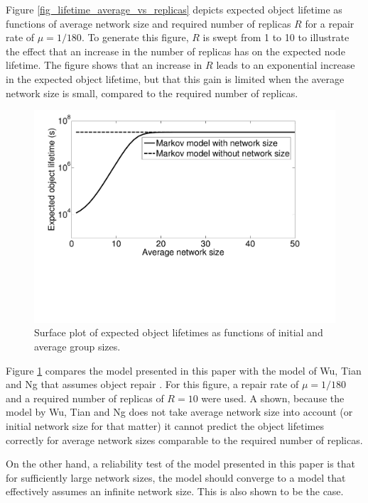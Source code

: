 \documentclass[10pt,a4paper,conference]{IEEEtran}
\begin{document}
Figure \ref{fig_lifetime_average_vs_replicas} depicts expected object lifetime as functions of average network size and required number of replicas $R$ for a repair rate of $\mu = 1/180$. To generate this figure, $R$ is swept from 1 to 10 to illustrate the effect that an increase in the number of replicas has on the expected node lifetime. The figure shows that an increase in $R$ leads to an exponential increase in the expected object lifetime, but that this gain is limited when the average network size is small, compared to the required number of replicas.

\begin{figure}[htbp]
 \centering
 \includegraphics[clip=true, viewport=1.0cm 6.5cm 26.5cm 20.5cm, width=0.8\columnwidth]{lifetime_av_models_compare}
 \caption{Surface plot of expected object lifetimes as functions of initial and average group sizes.}
 \label{fig_lifetime_vs_other_model}
\end{figure}

Figure \ref{fig_lifetime_vs_other_model} compares the model presented in this paper with the model of Wu, Tian and Ng that assumes object repair \cite{replication_article}. For this figure, a repair rate of $\mu = 1/180$ and a required number of replicas of $R = 10$ were used. A shown, because the model by Wu, Tian and Ng does not take average network size into account (or initial network size for that matter) it cannot predict the object lifetimes correctly for average network sizes comparable to the required number of replicas.

On the other hand, a reliability test of the model presented in this paper is that for sufficiently large network sizes, the model should converge to a model that effectively assumes an infinite network size. This is also shown to be the case.
\end{document}
